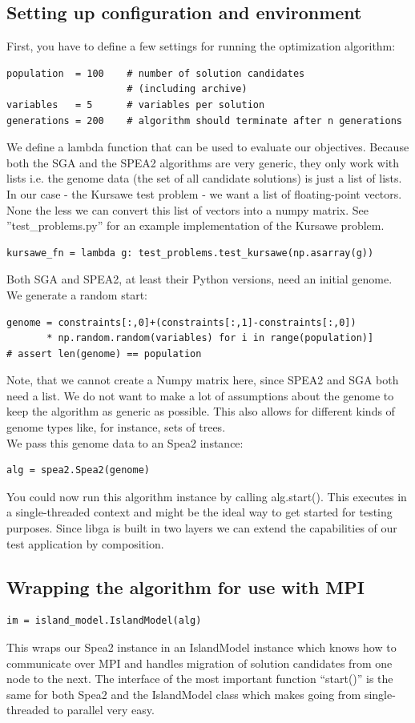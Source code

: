 \documentclass[12pt]{article}
\begin{document}
\subsection{Setting up configuration and environment}
First, you have to define a few settings for running the optimization algorithm: 
\begin{lstlisting}[style=Python]
population  = 100    # number of solution candidates 
                     # (including archive)
variables   = 5      # variables per solution
generations = 200    # algorithm should terminate after n generations
\end{lstlisting}
We define a lambda function that can be used to evaluate our objectives. Because both the SGA and the SPEA2 algorithms are very generic, they only work with lists i.e. the genome data (the set of all candidate solutions) is just a list of lists. In our case - the Kursawe test problem - we want a list of floating-point vectors. None the less we can convert this list of vectors into a numpy matrix. See ''test\_problems.py'' for an example implementation of the Kursawe problem.  
\begin{lstlisting}[style=Python]
kursawe_fn = lambda g: test_problems.test_kursawe(np.asarray(g))
\end{lstlisting}
Both SGA and SPEA2, at least their Python versions, need an initial genome. We generate a random start: 
\begin{lstlisting}[style=Python]
genome = constraints[:,0]+(constraints[:,1]-constraints[:,0])
       * np.random.random(variables) for i in range(population)]
# assert len(genome) == population
\end{lstlisting}
Note, that we cannot create a Numpy matrix here, since SPEA2 and SGA both need a list. We do not want to make a lot of assumptions about the genome to keep the algorithm as generic as possible. This also allows for different kinds of genome types like, for instance, sets of trees. \\
We pass this genome data to an Spea2 instance: 
\begin{lstlisting}[style=Python]
alg = spea2.Spea2(genome)
\end{lstlisting}
You could now run this algorithm instance by calling alg.start(). This executes in a single-threaded context and might be the ideal way to get started for testing purposes. Since libga is built in two layers we can extend the capabilities of our test application by composition. 
\subsection{Wrapping the algorithm for use with MPI}
\begin{lstlisting}[style=Python]
im = island_model.IslandModel(alg)
\end{lstlisting}
This wraps our Spea2 instance in an IslandModel instance which knows how to communicate over MPI and handles migration of solution candidates from one node to the next. The interface of the most important function ``start()'' is the same for both Spea2 and the IslandModel class which makes going from single-threaded to parallel very easy. 
\end{document}
